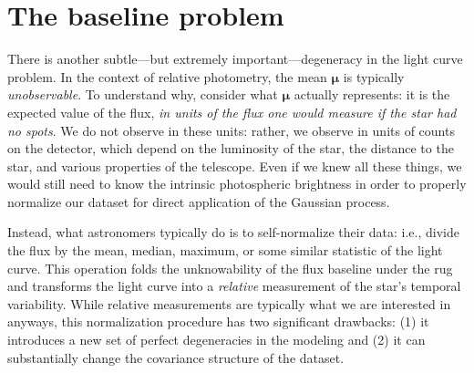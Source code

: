\documentclass[modern]{aastex62}
\begin{document}
\section{The baseline problem}
\label{sec:baseline}

There is another subtle---but extremely important---degeneracy in the
light curve problem.
%
%
In the context of
relative photometry, the mean $\pmb{\mu}$ is typically \emph{unobservable}.
%
To understand why, consider what
$\pmb{\mu}$ actually represents:
it is the expected value
of the flux,
\emph{in units of the flux one would measure if the star had no spots}.
We do not observe in these units: rather, we observe in units of counts on
the detector, which depend on the luminosity of the star, the distance to
the star, and various properties of the telescope. Even if we knew all these
things, we would still need to know the intrinsic photospheric brightness
in order to properly normalize our dataset for direct application of
the Gaussian process.

Instead, what astronomers typically do is to self-normalize their data:
i.e., divide the flux by the mean, median, maximum, or some similar
statistic of the light curve. This operation folds the unknowability of
the flux baseline under the rug and transforms the light curve into a \emph{relative}
measurement of the star's temporal variability. While relative measurements
are typically what we are interested in anyways, this normalization procedure
has two significant drawbacks: (1) it introduces a new set of perfect degeneracies
in the modeling and (2) it can substantially change the covariance structure
of the dataset.
\end{document}
